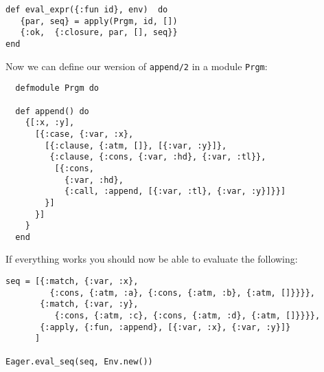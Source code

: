 \documentclass[a4paper,11pt]{article}
\begin{document}
\begin{verbatim}
def eval_expr({:fun id}, env)  do
   {par, seq} = apply(Prgm, id, [])
   {:ok,  {:closure, par, [], seq}}
end
\end{verbatim}

\noindent Now we can define our wersion of {\tt append/2} in a module {\tt Prgm}:

\begin{verbatim}
  defmodule Prgm do

  def append() do
    {[:x, :y],
      [{:case, {:var, :x}, 
        [{:clause, {:atm, []}, [{:var, :y}]},
         {:clause, {:cons, {:var, :hd}, {:var, :tl}}, 
          [{:cons, 
            {:var, :hd}, 
            {:call, :append, [{:var, :tl}, {:var, :y}]}}]
        }]
      }]
    }
  end
\end{verbatim}

\noindent If everything works you should now be able to evaluate the following:

\begin{verbatim}
seq = [{:match, {:var, :x}, 
         {:cons, {:atm, :a}, {:cons, {:atm, :b}, {:atm, []}}}},
       {:match, {:var, :y}, 
          {:cons, {:atm, :c}, {:cons, {:atm, :d}, {:atm, []}}}},
       {:apply, {:fun, :append}, [{:var, :x}, {:var, :y}]}
      ]
    
Eager.eval_seq(seq, Env.new())
\end{verbatim}
\end{document}
